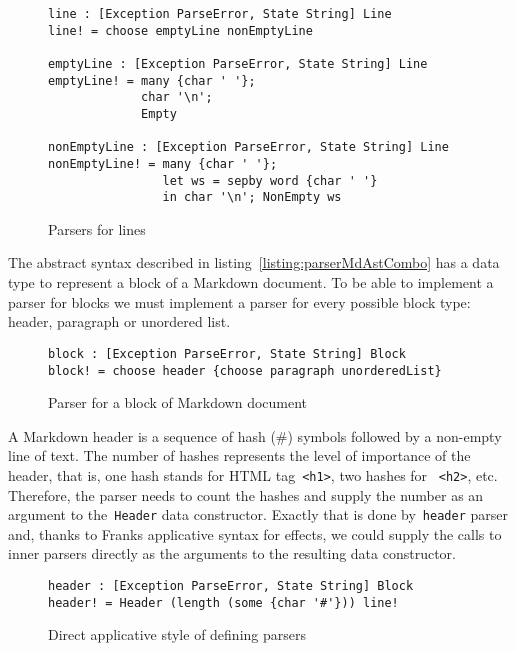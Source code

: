       \begin{figure}[h]
      \begin{lstlisting}
line : [Exception ParseError, State String] Line
line! = choose emptyLine nonEmptyLine

emptyLine : [Exception ParseError, State String] Line
emptyLine! = many {char ' '};
             char '\n';
             Empty

nonEmptyLine : [Exception ParseError, State String] Line
nonEmptyLine! = many {char ' '};
                let ws = sepby word {char ' '}
                in char '\n'; NonEmpty ws
      \end{lstlisting}
      \caption{Parsers for lines}
      \label{listing:parserLineCombo}
      \end{figure}

      The abstract syntax described in listing~\ref{listing:parserMdAstCombo}
      has a data type to represent a block of a Markdown document. To be able to
      implement a parser for blocks we must implement a parser for every possible
      block type: header, paragraph or unordered list.

      \begin{figure}[h]
      \begin{lstlisting}
block : [Exception ParseError, State String] Block
block! = choose header {choose paragraph unorderedList}
      \end{lstlisting}
      \caption{Parser for a block of Markdown document}
      \label{listing:parserExprAppCombo}
      \end{figure}

      A Markdown header is a sequence of hash (\#) symbols followed by a
      non-empty line of text. The number of hashes represents the level of
      importance of the header, that is, one hash stands for HTML
      tag~\texttt{<h1>}, two hashes for ~\texttt{<h2>}, etc. Therefore, the parser
      needs to count the hashes and supply the number as an argument to the~\texttt{Header}
      data constructor. Exactly that is done by~\texttt{header} parser and, thanks to Franks
      applicative syntax for effects, we could supply the calls to inner parsers directly
      as the arguments to the resulting data constructor.

      \begin{figure}[h]
      \begin{lstlisting}
header : [Exception ParseError, State String] Block
header! = Header (length (some {char '#'})) line!
      \end{lstlisting}
      \caption{Direct applicative style of defining parsers}
      \label{listing:parserExprAppCombo}
      \end{figure}

